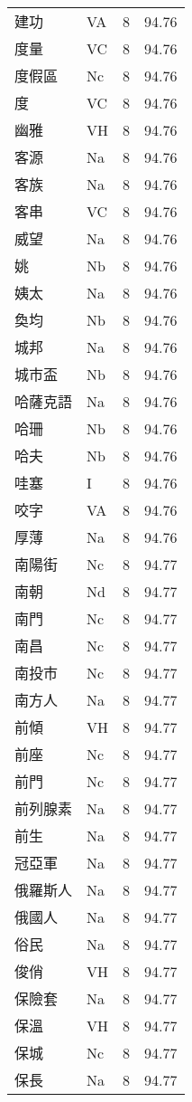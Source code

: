 \documentclass[twocolumn]{book}
\begin{document}
\begin{supertabular}{llrr}
建功 & VA & 8 &  94.76\\
度量 & VC & 8 &  94.76\\
度假區 & Nc & 8 &  94.76\\
度 & VC & 8 &  94.76\\
幽雅 & VH & 8 &  94.76\\
客源 & Na & 8 &  94.76\\
客族 & Na & 8 &  94.76\\
客串 & VC & 8 &  94.76\\
威望 & Na & 8 &  94.76\\
姚 & Nb & 8 &  94.76\\
姨太 & Na & 8 &  94.76\\
奐均 & Nb & 8 &  94.76\\
城邦 & Na & 8 &  94.76\\
城市盃 & Nb & 8 &  94.76\\
哈薩克語 & Na & 8 &  94.76\\
哈珊 & Nb & 8 &  94.76\\
哈夫 & Nb & 8 &  94.76\\
哇塞 & I & 8 &  94.76\\
咬字 & VA & 8 &  94.76\\
厚薄 & Na & 8 &  94.76\\
南陽街 & Nc & 8 &  94.77\\
南朝 & Nd & 8 &  94.77\\
南門 & Nc & 8 &  94.77\\
南昌 & Nc & 8 &  94.77\\
南投市 & Nc & 8 &  94.77\\
南方人 & Na & 8 &  94.77\\
前傾 & VH & 8 &  94.77\\
前座 & Nc & 8 &  94.77\\
前門 & Nc & 8 &  94.77\\
前列腺素 & Na & 8 &  94.77\\
前生 & Na & 8 &  94.77\\
冠亞軍 & Na & 8 &  94.77\\
俄羅斯人 & Na & 8 &  94.77\\
俄國人 & Na & 8 &  94.77\\
俗民 & Na & 8 &  94.77\\
俊俏 & VH & 8 &  94.77\\
保險套 & Na & 8 &  94.77\\
保溫 & VH & 8 &  94.77\\
保城 & Nc & 8 &  94.77\\
保長 & Na & 8 &  94.77\\

\end{supertabular}
\end{document}
